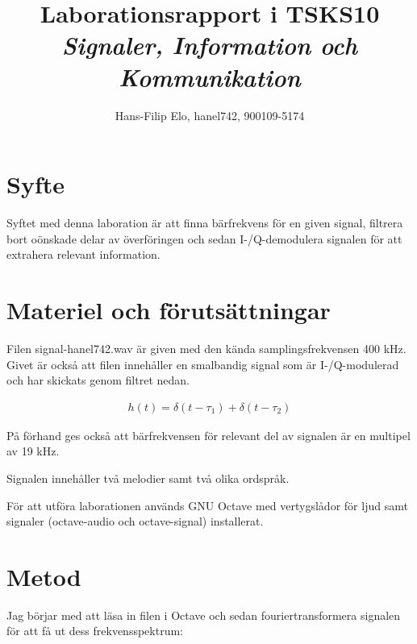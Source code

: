 \documentclass[10pt,twocolumn]{article}
\title{Laborationsrapport i TSKS10 \emph{Signaler, Information och Kommunikation}}
\author{Hans-Filip Elo, hanel742, 900109-5174}
\begin{document}
\maketitle

\section{Syfte}

Syftet med denna laboration är att finna bärfrekvens för en given signal, filtrera bort oönskade delar av överföringen och sedan I-/Q-demodulera signalen för att extrahera relevant information. 

\section{Materiel och förutsättningar}

Filen signal-hanel742.wav är given med den kända samplingsfrekvensen 400 kHz. Givet är också att filen innehåller en smalbandig signal som är I-/Q-modulerad och har skickats genom filtret nedan. 

\begin{gather}
h(t) = \delta(t - \tau_1) + \delta(t - \tau_2)
\label{equ:filter}
\end{gather}

På förhand ges också att bärfrekvensen för relevant del av signalen är en multipel av 19 kHz.

Signalen innehåller två melodier samt två olika ordspråk. 

För att utföra laborationen används GNU Octave med vertygslådor för ljud samt signaler (octave-audio och octave-signal) installerat. 

\section{Metod}

Jag börjar med att läsa in filen i Octave och sedan fouriertransformera signalen för att få ut dess frekvensspektrum: 
\end{document}
